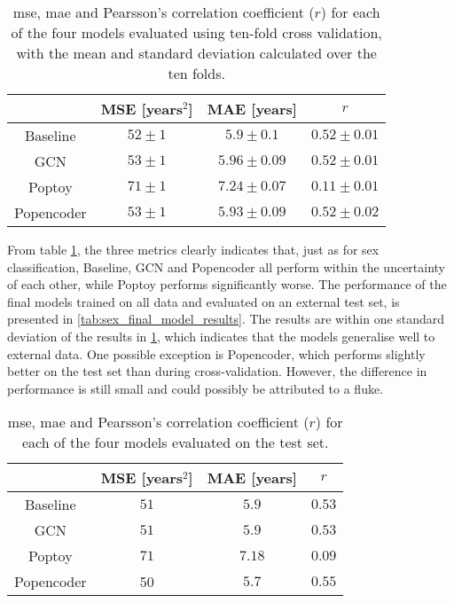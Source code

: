 \begin{table}[!htbp]
    \centering
    \caption{\acrfull{mse}, \acrfull{mae} and Pearsson's correlation coefficient ($r$) for each of the four models evaluated using ten-fold cross validation, with the mean and standard deviation calculated over the ten folds.}
    \begin{tabular}{c|c|c|c}
         &  MSE [years$^2$]& MAE [years] & $r$ \\ \hline 
        Baseline &$52\pm1$& $5.9\pm0.1$&$0.52\pm0.01$\\
        GCN & $53\pm1$& $5.96\pm 0.09 $& $0.52\pm0.01$\\
        Poptoy &$71\pm 1$ & $7.24\pm0.07$ &$ 0.11\pm 0.01$\\
        Popencoder &$53\pm1$& $5.93\pm 0.09$ & $0.52\pm0.02$\\
    \end{tabular}
    \label{tab:age_model_results}
\end{table}
From table \ref{tab:age_model_results}, the three metrics clearly indicates that, just as for sex classification, Baseline, GCN and Popencoder all perform within the uncertainty of each other, while Poptoy performs significantly worse. The performance of the final models trained on all data and evaluated on an external test set, is presented in \cref{tab:sex_final_model_results}. The results are within one standard deviation of the results in \cref{tab:age_model_results}, which indicates that the models generalise well to external data. One possible exception is Popencoder, which performs slightly better on the test set than during cross-validation. However, the difference in performance is still small and could possibly be attributed to a fluke.

\begin{table}[!htbp]
    \centering
    \caption{\acrfull{mse}, \acrfull{mae} and Pearsson's correlation coefficient ($r$) for each of the four models evaluated on the test set.}
    \begin{tabular}{c|c|c|c}
         &  MSE [years$^2$]& MAE [years] & $r$ \\ \hline 
        Baseline & $51 $& $5.9 $&$0.53 $\\
        GCN & $51 $& $5.9  $& $0.53 $\\
        Poptoy &$71 $ & $7.18 $ &$ 0.09 $\\
        Popencoder &50 & $5.7 $ & $0.55 $\\
    \end{tabular}
    \label{tab:age_final_model_results}
\end{table}

